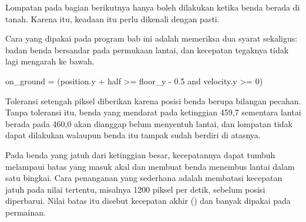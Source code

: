 Lompatan pada bagian berikutnya hanya boleh dilakukan ketika benda berada di
tanah. Karena itu, keadaan itu perlu dikenali dengan pasti.

Cara yang dipakai pada program bab ini adalah memeriksa dua syarat sekaligus:
badan benda bersandar pada permukaan lantai, dan kecepatan tegaknya tidak lagi
mengarah ke bawah.

\begin{kodekeluaran}
on_ground = (position.y + half >= floor_y - 0.5 and velocity.y >= 0)
\end{kodekeluaran}

Toleransi setengah piksel diberikan karena posisi benda berupa bilangan
pecahan. Tanpa toleransi itu, benda yang mendarat pada ketinggian 459,7
sementara lantai berada pada 460,0 akan dianggap belum menyentuh lantai, dan
lompatan tidak dapat dilakukan walaupun benda itu tampak sudah berdiri di
atasnya.

\begin{catatabox}
Pada benda yang jatuh dari ketinggian besar, kecepatannya dapat tumbuh
melampaui batas yang masuk akal dan membuat benda menembus lantai dalam satu
bingkai. Cara penanganan yang sederhana adalah membatasi kecepatan jatuh pada
nilai tertentu, misalnya 1200 piksel per detik, sebelum posisi diperbarui.
Nilai batas itu disebut kecepatan akhir () dan
banyak dipakai pada permainan.
\end{catatabox}
